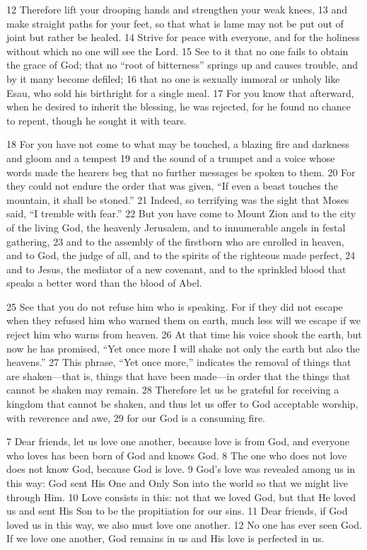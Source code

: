\begin{bible}
12 Therefore lift your drooping hands and strengthen your weak knees, 13 and make straight paths for your feet, so that what is lame may not be put out of joint but rather be healed. 14 Strive for peace with everyone, and for the holiness without which no one will see the Lord. 15 See to it that no one fails to obtain the grace of God; that no ``root of bitterness'' springs up and causes trouble, and by it many become defiled; 16 that no one is sexually immoral or unholy like Esau, who sold his birthright for a single meal. 17 For you know that afterward, when he desired to inherit the blessing, he was rejected, for he found no chance to repent, though he sought it with tears.

18 For you have not come to what may be touched, a blazing fire and darkness and gloom and a tempest 19 and the sound of a trumpet and a voice whose words made the hearers beg that no further messages be spoken to them. 20 For they could not endure the order that was given, ``If even a beast touches the mountain, it shall be stoned.'' 21 Indeed, so terrifying was the sight that Moses said, ``I tremble with fear.'' 22 But you have come to Mount Zion and to the city of the living God, the heavenly Jerusalem, and to innumerable angels in festal gathering, 23 and to the assembly of the firstborn who are enrolled in heaven, and to God, the judge of all, and to the spirits of the righteous made perfect, 24 and to Jesus, the mediator of a new covenant, and to the sprinkled blood that speaks a better word than the blood of Abel.

25 See that you do not refuse him who is speaking. For if they did not escape when they refused him who warned them on earth, much less will we escape if we reject him who warns from heaven. 26 At that time his voice shook the earth, but now he has promised, ``Yet once more I will shake not only the earth but also the heavens.'' 27 This phrase, ``Yet once more,'' indicates the removal of things that are shaken—that is, things that have been made—in order that the things that cannot be shaken may remain. 28 Therefore let us be grateful for receiving a kingdom that cannot be shaken, and thus let us offer to God acceptable worship, with reverence and awe, 29 for our God is a consuming fire.

7 Dear friends, let us love one another, because love is from God, and everyone who loves has been born of God and knows God. 8 The one who does not love does not know God, because God is love. 9 God's love was revealed among us in this way: God sent His One and Only Son into the world so that we might live through Him. 10 Love consists in this: not that we loved God, but that He loved us and sent His Son to be the propitiation for our sins. 11 Dear friends, if God loved us in this way, we also must love one another. 12 No one has ever seen God. If we love one another, God remains in us and His love is perfected in us.
\end{bible}

